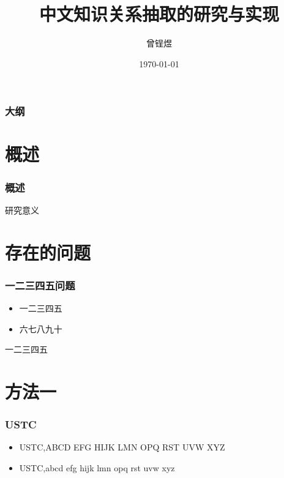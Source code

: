 ﻿\documentclass[12pt]{ctexbeamer}	%
\title{中文知识关系抽取的研究与实现}	%
\author[曾锃煜]{曾锃煜}
\institute[中国科学技术大学]{中国科学技术大学，计算机科学与技术系}	%
\date{\today}
\begin{document}
\begin{frame}
\titlepage
\end{frame}


\begin{frame}
\frametitle{大纲}
\tableofcontents
\end{frame}


\section{概述}
\begin{frame}
\frametitle{概述}
研究意义
\end{frame}


\section{存在的问题}

\begin{frame}
\frametitle{一二三四五问题}
\begin{itemize}
\item 一二三四五
\item \alert{六七八九十}
\end{itemize}
\pause
一二三四五

\end{frame}


\section{方法一}

\begin{frame}
\frametitle{USTC}

\begin{itemize}
\item<1-> USTC,ABCD EFG HIJK LMN OPQ RST UVW XYZ
\item<2-> USTC,abcd efg hijk lmn opq rst uvw xyz
\end{itemize}


\end{frame}
\end{document}
